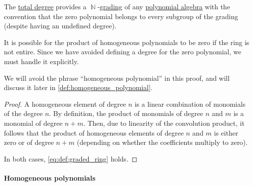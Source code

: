 \begin{proposition}\label{thm:polynomial_algebra_grading}
  The \hyperref[def:polynomial_degree]{total degree} provides a \( \BbbN \)-\hyperref[def:graded_ring]{grading} of any \hyperref[def:polynomial_algebra]{polynomial algebra} with the convention that the zero polynomial belongs to every subgroup of the grading (despite having an undefined degree).
\end{proposition}
\begin{comments}
  \item It is possible for the product of homogeneous polynomials to be zero if the ring is not entire. Since we have avoided defining a degree for the zero polynomial, we must handle it explicitly.

  \item We will avoid the phrase \enquote{homogeneous polynomial} in this proof, and will discuss it later in \cref{def:homogeneous_polynomial}.
\end{comments}
\begin{proof}
  A homogeneous element of degree \( n \) is a linear combination of monomials of the degree \( n \). By definition, the product of monomials of degree \( n \) and \( m \) is a monomial of degree \( n + m \). Then, due to linearity of the convolution product, it follows that the product of homogeneous elements of degree \( n \) and \( m \) is either zero or of degree \( n + m \) (depending on whether the coefficients multiply to zero).

  In both cases, \eqref{eq:def:graded_ring} holds.
\end{proof}

\paragraph{Homogeneous polynomials}

